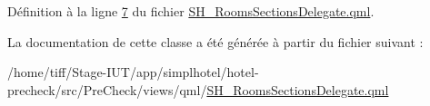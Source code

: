 Définition à la ligne \hyperlink{SH__RoomsSectionsDelegate_8qml_source_l00007}{7} du fichier \hyperlink{SH__RoomsSectionsDelegate_8qml_source}{S\-H\-\_\-\-Rooms\-Sections\-Delegate.\-qml}.



La documentation de cette classe a été générée à partir du fichier suivant \-:\begin{DoxyCompactItemize}
\item 
/home/tiff/\-Stage-\/\-I\-U\-T/app/simplhotel/hotel-\/precheck/src/\-Pre\-Check/views/qml/\hyperlink{SH__RoomsSectionsDelegate_8qml}{S\-H\-\_\-\-Rooms\-Sections\-Delegate.\-qml}\end{DoxyCompactItemize}
